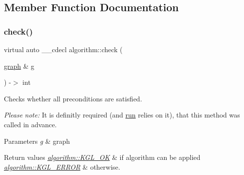 \subsection{Member Function Documentation}
\mbox{\label{classalgorithm_a05c0f25463eb35a77b2d73fc06bb2c0e}} 
\subsubsection{\texorpdfstring{check()}{check()}}
{\footnotesize\ttfamily virtual auto \+\_\+\+\_\+cdecl algorithm\+::check (\begin{DoxyParamCaption}\item[{\mbox{\hyperlink{classgraph}{graph}} \&}]{g }\end{DoxyParamCaption}) -\/$>$  int\hspace{0.3cm}{\ttfamily [pure virtual]}}



Checks whether all preconditions are satisfied. 

{\itshape Please} {\itshape note\+:} It is definitly required (and \mbox{\hyperlink{classalgorithm_a482eb28cacba018b5a86d3a819a50a2f}{run}} relies on it), that this method was called in advance.


\begin{DoxyParams}{Parameters}
{\em g} & graph \\
\hline
\end{DoxyParams}

\begin{DoxyRetVals}{Return values}
{\em \mbox{\hyperlink{classalgorithm_af1a0078e153aa99c24f9bdf0d97f6710aae4c1cd7fe8d8cf4b143241a6e7c31cf}{algorithm\+::\+K\+G\+L\+\_\+\+OK}}} & if algorithm can be applied \\
\hline
{\em \mbox{\hyperlink{classalgorithm_af1a0078e153aa99c24f9bdf0d97f6710ae67bf27b2ef31f73e545a7f9f4a69556}{algorithm\+::\+K\+G\+L\+\_\+\+E\+R\+R\+OR}}} & otherwise. \\
\hline
\end{DoxyRetVals}


